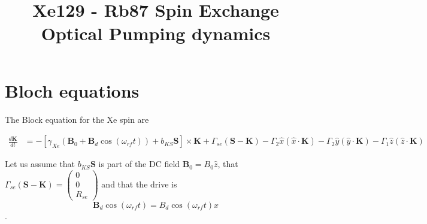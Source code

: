 \documentclass{article}
\begin{document}
\title{Xe129 - Rb87 Spin Exchange Optical Pumping dynamics}
\maketitle



\section{Bloch equations}
The Block equation for the Xe spin are

\begin{align}
    \frac{d \mathbf{K}}{d t} &= -\left[\gamma_{Xe}\left( \mathbf{B}_0 + \mathbf{B}_d \cos{(\omega_{rf} t)}\right) + b_{KS} \mathbf{S}\right] \times\mathbf{K}  +\Gamma_{se} \left( \mathbf{S} - \mathbf{K}\right) - \Gamma_2 \hat{x}\left(\hat{x}\cdot \mathbf{K}\right)  - \Gamma_2 \hat{y}\left(\hat{y}\cdot \mathbf{K}\right) -  \Gamma_1 \hat{z}\left(\hat{z}\cdot \mathbf{K}\right)
\end{align}

Let us assume that $b_{KS} \mathbf{S}$ is part of the DC field $\mathbf{B}_0=B_0 \hat{z}$, that $\Gamma_{se} \left( \mathbf{S} - \mathbf{K}\right)=\left(\begin{array}{c}0\\0\\R_{se}\end{array}\right)$ and that the drive is $$\mathbf{B}_d \cos{(\omega_{rf} t)} =B_d \cos{(\omega_{rf} t)}\hat{x}$$ .
\end{document}
